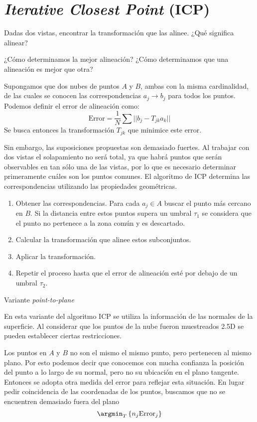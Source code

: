 \section{\emph{Iterative Closest Point} (ICP)}
Dadas dos vistas, encontrar la transformación que las alinee.
¿Qué significa alinear?

¿Cómo determinamos la mejor alineación?
¿Cómo determinamos que una alineación es mejor que otra? 


Supongamos que dos nubes de puntos $A$ y $B$,
ambas con la misma cardinalidad,
de las cuales se conocen las correspondencias $a_j \to b_j$
para todos los puntos.
Podemos definir el error de alineación como:
\[
	\text{Error} = \frac{1}{N} \sum || b_j - T_{jk} a_k ||
\]
Se busca entonces la transformación $T_{jk}$ que minimice este error.

Sin embargo, las suposiciones propuestas son demasiado fuertes.
Al trabajar con dos vistas el solapamiento no será total, ya que habrá puntos que serán observables
en tan sólo una de las vistas, por lo que es necesario
determinar primeramente cuáles son los puntos comunes.
El algoritmo de ICP determina las correspondencias utilizando las propiedades geométricas.
\begin{enumerate}
	\item Obtener las correspondencias.
		Para cada $a_j \in A$ buscar el punto más cercano en $B$.
		Si la distancia entre estos puntos supera un umbral $\tau_1$
		se considera que el punto no pertenece a la zona común y es descartado.
	\item Calcular la transformación que alinee estos subconjuntos. 
	\item Aplicar la transformación.
	\item Repetir el proceso hasta que el error de alineación esté por debajo de un umbral $\tau_2$.
\end{enumerate}

Variante \emph{point-to-plane}

En esta variante del algoritmo ICP se utiliza la información
de las normales de la superficie.
Al considerar que los puntos de la nube fueron muestreados 2.5D
se pueden establecer ciertas restricciones.

Los puntos en $A$ y $B$ no son el mismo el mismo punto, pero pertenecen al
mismo plano.  Por esto podemos decir que conocemos con mucha confianza la
posición del punto a lo largo de su normal, pero no su ubicación en el plano
tangente.
Entonces se adopta otra medida del error para reflejar esta situación.
En lugar pedir coincidencia de las coordenadas de los puntos, buscamos que no
se encuentren demasiado fuera del plano
\[
	\argmin_{T} \left\{ n_j \text{Error}_j \right \}
\]

